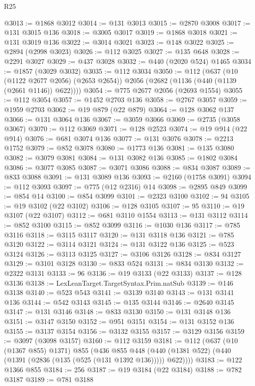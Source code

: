 \begin{lexlean}{R25}
\begin{coremodule}
@3013 := @1868 @3012
@3014 := @131 @3013
@3015 := @2870 @3008
@3017 := @131 @3015 @136
@3018 := @3005 @3017
@3019 := @1868 @3018
@3021 := @131 @3019 @136
@3022 := @3014 @3021
@3023 := @148 @3022
@3025 := @2894 (@2998 @3023)
@3026 := @112 @3025
@3027 := @135 @648
@3028 := @2291 @3027
@3029 := @437 @3028
@3032 := @440 (@2020 @524) @1465
@3034 := @1857 (@3029 @3032)
@3035 := @112 @3034
@3050 := @112
    (@637
      (@10 (@1122 @2677 @2056) (@2653 @2654))
      @2056
      (@2682 (@1136 (@440 (@1139 (@2661 @1146)) @622))))
@3054 := @775 @2677 @2056 (@2693 @1554)
@3055 := @112 @3054
@3057 := @1452 @2703 @136
@3058 := @2767 @3057
@3059 := @1959 @2703
@3062 := @19 @879 (@22 @879)
@3064 := @128 @3062 @137
@3066 := @131 @3064 @136
@3067 := @3059 @3066
@3069 := @2735 (@3058 @3067)
@3070 := @112 @3069
@3071 := @128 @2523
@3074 := @19 @914 (@22 @914)
@3076 := @681 @3074 @136
@3077 := @131 @3076
@3078 := @2213 @1752
@3079 := @852 @3078
@3080 := @1773 @136
@3081 := @135 @3080
@3082 := @3079 @3081
@3084 := @131 @3082 @136
@3085 := @1802 @3084
@3086 := @3077 @3085
@3087 := @3071 @3086
@3088 := @834 @3087
@3089 := @833 @3088
@3091 := @131 @3089 @136
@3093 := @2160 (@1758 @3091)
@3094 := @112 @3093
@3097 := @775 (@12 @2316) @14
@3098 := @2895 @849
@3099 := @854 @14
@3100 := @854 @3099
@3101 := @2323 @3100
@3102 := 94
@3105 := @19 @3102 (@22 @3102)
@3106 := @128 @3105
@3107 := 95
@3110 := @19 @3107 (@22 @3107)
@3112 := @681 @3110 @1554
@3113 := @131 @3112
@3114 := @852 @3100
@3115 := @852 @3099
@3116 := @1030 @136
@3117 := @785 @3116
@3118 := @3115 @3117
@3120 := @131 @3118 @136
@3121 := @785 @3120
@3122 := @3114 @3121
@3124 := @131 @3122 @136
@3125 := @523 @3124
@3126 := @3113 @3125
@3127 := @3106 @3126
@3128 := @834 @3127
@3129 := @3101 @3128
@3130 := @833 @524
@3131 := @834 @3130
@3132 := @2322 @3131
@3133 := 96
@3136 := @19 @3133 (@22 @3133)
@3137 := @128 @3136
@3138 := LexLeanTarget.TargetSyntax.Prim.natSub
@3139 := @146 @3138
@3140 := @523 @543
@3141 := @3139 @3140
@3143 := @131 @3141 @136
@3144 := @542 @3143
@3145 := @135 @3144
@3146 := @2640 @3145
@3147 := @131 @3146
@3148 := @833 @3130
@3150 := @131 @3148 @136
@3151 := @3147 @3150
@3152 := @951 @3151
@3154 := @131 @3152 @136
@3155 := @3137 @3154
@3156 := @3132 @3155
@3157 := @3129 @3156
@3159 := @3097 (@3098 @3157)
@3160 := @112 @3159
@3181 := @112
    (@637
      (@10 (@1367 @855) @1371)
      @855
      (@436
        @855
        @448
        (@440 (@1381 @522) (@440 (@1391 (@2836 (@135 (@525 (@131 @1392 @136))))) @622))))
@3183 := @122 @1366 @855
@3184 := 256
@3187 := @19 @3184 (@22 @3184)
@3188 := @782 @3187
@3189 := @781 @3188

\end{coremodule}
\end{lexlean}
